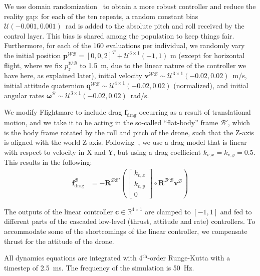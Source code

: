 We use domain randomization~\cite{tobin2017domain} to obtain a more robust controller and reduce the reality gap: for each of the ten repeats, a random constant bias $\mathcal{U}(-0.001, 0.001)$~rad is added to the absolute pitch and roll received by the control layer. This bias is shared among the population to keep things fair. Furthermore, for each of the 160 evaluations per individual, we randomly vary the initial position $\boldsymbol{p}^\mathcal{WB} = [0,0,2]^T + \mathcal{U}^{3\times1}(-1, 1)$ m (except for horizontal flight, where we fix $p^\mathcal{WB}_{z}$ to 1.5~m, due to the linear nature of the controller we have here, as explained later), initial velocity $\boldsymbol{v}^\mathcal{WB} \sim \mathcal{U}^{3\times1}(-0.02, 0.02)$~m/s, initial attitude quaternion $\boldsymbol{q}^\mathcal{WB} \sim \mathcal{U}^{4\times1}(-0.02, 0.02)$ (normalized), and initial angular rates $\boldsymbol{\omega}^\mathcal{B} \sim \mathcal{U}^{3\times1}(-0.02, 0.02)$~rad/s.

We modify Flightmare to include drag $\boldsymbol{f}_\mathrm{drag}$ occurring as a result of translational motion, and we take it to be acting in the so-called ``flat-body'' frame $\mathcal{B'}$, which is the body frame rotated by the roll and pitch of the drone, such that the Z-axis is aligned with the world Z-axis. Following~\cite{dewagter2022sensing}, we use a drag model that is linear with respect to velocity in X and Y, but using a drag coefficient $k_{v,x}=k_{v,y}=0.5$. This results in the following:
\begin{align}
    \boldsymbol{f}_\mathrm{drag}^\mathcal{B} &= -\boldsymbol{R}^\mathcal{BB'}
    \left(
    \begin{bmatrix}
        k_{v,x} \\
        k_{v,y} \\
        0
    \end{bmatrix}
    \circ \boldsymbol{R}^\mathcal{B'B}\boldsymbol{v}^\mathcal{B}
    \right)
\end{align}

The outputs of the linear controller $\boldsymbol{c}\in \mathbb{R}^{4\times1}$ are clamped to $[-1,1]$ and fed to different parts of the cascaded low-level (thrust, attitude and rate) controllers. To accommodate some of the shortcomings of the linear controller, we compensate thrust for the attitude of the drone.

All dynamics equations are integrated with 4$^{\mathrm{th}}$-order Runge-Kutta with a timestep of 2.5~ms. The frequency of the simulation is 50~Hz. %

